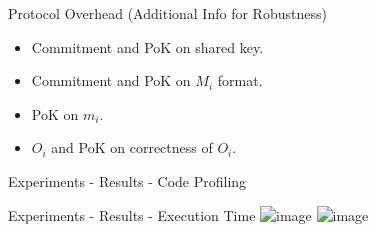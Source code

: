 \begin{frame}{Protocol Overhead (Additional Info for Robustness)}
    \begin{itemize}
        \item Commitment and PoK on shared key.
        \item Commitment and PoK on $M_i$ format.
        \item PoK on $m_i$.
        \item $O_i$ and PoK on correctness of $O_i$.
    \end{itemize}
    
\end{frame}

\begin{frame}{Experiments - Results - Code Profiling}
\end{frame}

\begin{frame}{Experiments - Results - Execution Time}
    \centering
    \includegraphics<1-1>[scale=0.23]{images/fixed_room.png}
    \includegraphics<2>[scale=0.23]{images/variable_room.png}
\end{frame}